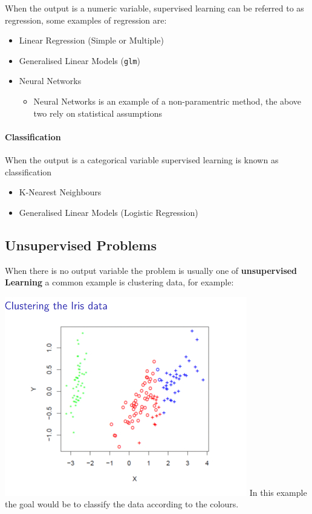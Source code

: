 \documentclass[]{book}
\providecommand{\tightlist}{%
  \setlength{\itemsep}{0pt}\setlength{\parskip}{0pt}}
\let\oldparagraph\paragraph
\renewcommand{\paragraph}[1]{\oldparagraph{#1}\mbox{}}
\begin{document}
When the output is a numeric variable, supervised learning can be referred to as regression, some examples of regression are:

\begin{itemize}
\tightlist
\item
  Linear Regression (Simple or Multiple)
\item
  Generalised Linear Models (\texttt{glm})
\item
  Neural Networks

  \begin{itemize}
  \tightlist
  \item
    Neural Networks is an example of a non-paramentric method, the above two rely on statistical assumptions
  \end{itemize}
\end{itemize}

\hypertarget{classification}{%
\paragraph{Classification}\label{classification}}

When the output is a categorical variable supervised learning is known as classification

\begin{itemize}
\tightlist
\item
  K-Nearest Neighbours
\item
  Generalised Linear Models (Logistic Regression)
\end{itemize}

\hypertarget{unsupervised-problems}{%
\subsection{Unsupervised Problems}\label{unsupervised-problems}}

When there is no output variable the problem is usually one of \textbf{unsupervised Learning} a common example is clustering data, for example:

\includegraphics{images/clust400px.jpg}
In this example the goal would be to classify the data according to the colours.
\end{document}
